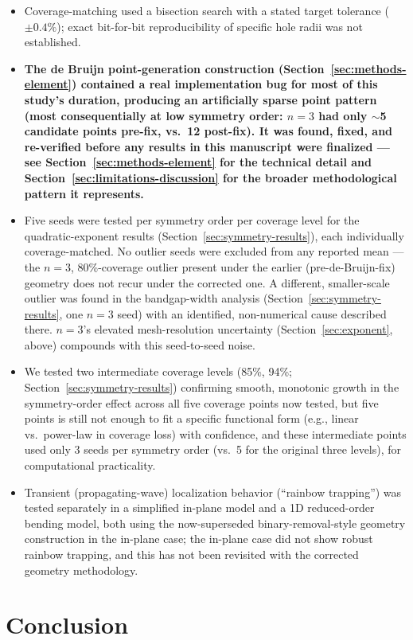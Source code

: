 \documentclass[11pt]{article}
\begin{document}
\begin{itemize}
\item Coverage-matching used a bisection search with a stated target tolerance ($\pm0.4\%$); exact bit-for-bit reproducibility of specific hole radii was not established.
\item \textbf{The de Bruijn point-generation construction (Section~\ref{sec:methods-element}) contained a real implementation bug for most of this study's duration, producing an artificially sparse point pattern (most consequentially at low symmetry order: $n=3$ had only $\sim$5 candidate points pre-fix, vs.\ 12 post-fix). It was found, fixed, and re-verified before any results in this manuscript were finalized --- see Section~\ref{sec:methods-element} for the technical detail and Section~\ref{sec:limitations-discussion} for the broader methodological pattern it represents.}
\item Five seeds were tested per symmetry order per coverage level for the quadratic-exponent results (Section~\ref{sec:symmetry-results}), each individually coverage-matched. No outlier seeds were excluded from any reported mean --- the $n=3$, 80\%-coverage outlier present under the earlier (pre-de-Bruijn-fix) geometry does not recur under the corrected one. A different, smaller-scale outlier was found in the bandgap-width analysis (Section~\ref{sec:symmetry-results}, one $n=3$ seed) with an identified, non-numerical cause described there. $n=3$'s elevated mesh-resolution uncertainty (Section~\ref{sec:exponent}, above) compounds with this seed-to-seed noise.
\item We tested two intermediate coverage levels (85\%, 94\%; Section~\ref{sec:symmetry-results}) confirming smooth, monotonic growth in the symmetry-order effect across all five coverage points now tested, but five points is still not enough to fit a specific functional form (e.g., linear vs.\ power-law in coverage loss) with confidence, and these intermediate points used only 3 seeds per symmetry order (vs.\ 5 for the original three levels), for computational practicality.
\item Transient (propagating-wave) localization behavior (``rainbow trapping'') was tested separately in a simplified in-plane model and a 1D reduced-order bending model, both using the now-superseded binary-removal-style geometry construction in the in-plane case; the in-plane case did not show robust rainbow trapping, and this has not been revisited with the corrected geometry methodology.
\end{itemize}

\section{Conclusion}
\end{document}
